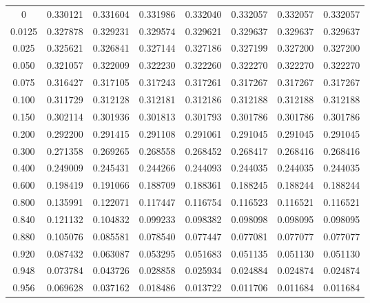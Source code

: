 \begin{threeparttable}
\begin{tabular}{S[table-format=1.4] S[table-format=1.6] S[table-format=1.6] S[table-format=1.6] S[table-format=1.6] S[table-format=1.6] S[table-format=1.6] S[table-format=1.6]}
        0   &  0.330121   &  0.331604   &  0.331986   &  0.332040   &  0.332057   &  0.332057   &  0.332057   \\
        0.0125   &  0.327878   &  0.329231   &  0.329574   &  0.329621   &  0.329637   &  0.329637   &  0.329637   \\
        0.025   &  0.325621   &  0.326841   &  0.327144   &  0.327186   &  0.327199   &  0.327200   &  0.327200   \\
        0.050   &  0.321057   &  0.322009   &  0.322230   &  0.322260   &  0.322270   &  0.322270   &  0.322270   \\
        0.075   &  0.316427   &  0.317105   &  0.317243   &  0.317261   &  0.317267   &  0.317267   &  0.317267   \\
        0.100   &  0.311729   &  0.312128   &  0.312181   &  0.312186   &  0.312188   &  0.312188   &  0.312188   \\
        0.150   &  0.302114   &  0.301936   &  0.301813   &  0.301793   &  0.301786   &  0.301786   &  0.301786   \\
        0.200   &  0.292200   &  0.291415   &  0.291108   &  0.291061   &  0.291045   &  0.291045   &  0.291045   \\
        0.300   &  0.271358   &  0.269265   &  0.268558   &  0.268452   &  0.268417   &  0.268416   &  0.268416   \\
        0.400   &  0.249009   &  0.245431   &  0.244266   &  0.244093   &  0.244035   &  0.244035   &  0.244035   \\
        0.600   &  0.198419   &  0.191066   &  0.188709   &  0.188361   &  0.188245   &  0.188244   &  0.188244   \\
        0.800   &  0.135991   &  0.122071   &  0.117447   &  0.116754   &  0.116523   &  0.116521   &  0.116521   \\
        0.840   &  0.121132   &  0.104832   &  0.099233   &  0.098382   &  0.098098   &  0.098095   &  0.098095   \\
        0.880   &  0.105076   &  0.085581   &  0.078540   &  0.077447   &  0.077081   &  0.077077   &  0.077077   \\
        0.920   &  0.087432   &  0.063087   &  0.053295   &  0.051683   &  0.051135   &  0.051130   &  0.051130   \\
        0.948   &  0.073784   &  0.043726   &  0.028858   &  0.025934   &  0.024884   &  0.024874   &  0.024874   \\
        0.956   &  0.069628   &  0.037162   &  0.018486   &  0.013722   &  0.011706   &  0.011684   &  0.011684   \\

\end{tabular}
\end{threeparttable}
